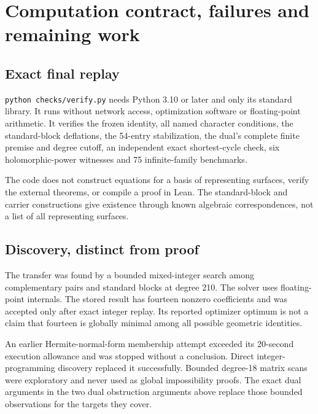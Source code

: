 \hypertarget{transfer210-computation-contract-failures-and-remaining-work}{%
\section{Computation contract, failures and remaining
work}\label{transfer210-computation-contract-failures-and-remaining-work}}

\hypertarget{transfer210-exact-final-replay}{%
\subsection{Exact final replay}\label{transfer210-exact-final-replay}}

\texttt{python\ checks/verify.py} needs Python 3.10 or later and only
its standard library. It runs without network access, optimization
software or floating-point arithmetic. It verifies the frozen identity,
all named character conditions, the standard-block deflations, the
54-entry stabilization, the dual's complete finite premise and degree
cutoff, an independent exact shortest-cycle check, six holomorphic-power
witnesses and 75 infinite-family benchmarks.

The code does not construct equations for a basis of representing
surfaces, verify the external theorems, or compile a proof in Lean. The
standard-block and carrier constructions give existence through known
algebraic correspondences, not a list of all representing surfaces.

\hypertarget{transfer210-discovery-distinct-from-proof}{%
\subsection{Discovery, distinct from
proof}\label{transfer210-discovery-distinct-from-proof}}

The transfer was found by a bounded mixed-integer search among
complementary pairs and standard blocks at degree 210. The solver uses
floating-point internals. The stored result has fourteen nonzero
coefficients and was accepted only after exact integer replay. Its
reported optimizer optimum is not a claim that fourteen is globally
minimal among all possible geometric identities.

An earlier Hermite-normal-form membership attempt exceeded its 20-second
execution allowance and was stopped without a conclusion. Direct
integer-programming discovery replaced it successfully. Bounded
degree-18 matrix scans were exploratory and never used as global
impossibility proofs. The exact dual arguments in the two dual
obstruction arguments above replace those bounded observations for the
targets they cover.

